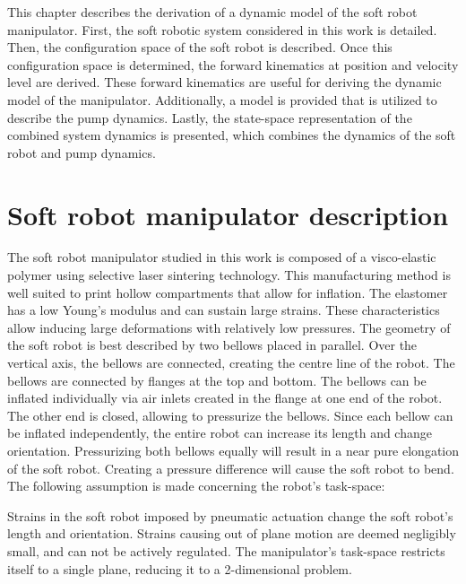 \label{chap2}

This chapter describes the derivation of a dynamic model of the soft robot manipulator. First, the soft robotic system considered in this work is detailed. Then, the configuration space of the soft robot is described. Once this configuration space is determined, the forward kinematics at position and velocity level are derived. These forward kinematics are useful for deriving the dynamic model of the manipulator. Additionally, a model is provided that is utilized to describe the pump dynamics. Lastly, the state-space representation of the combined system dynamics is presented, which combines the dynamics of the soft robot and pump dynamics.



\section{Soft robot manipulator description}

The soft robot manipulator studied in this work is composed of a visco-elastic polymer using selective laser sintering technology. This manufacturing method is well suited to print hollow compartments that allow for inflation. The elastomer has a low Young's modulus and can sustain large strains. These characteristics allow inducing large deformations with relatively low pressures. The geometry of the soft robot is best described by two bellows placed in parallel. Over the vertical axis, the bellows are connected, creating the centre line of the robot. The bellows are connected by flanges at the top and bottom. The bellows can be inflated individually via air inlets created in the flange at one end of the robot. The other end is closed, allowing to pressurize the bellows. Since each bellow can be inflated independently, the entire robot can increase its length and change orientation. Pressurizing both bellows equally will result in a near pure elongation of the soft robot. Creating a pressure difference will cause the soft robot to bend. The following assumption is made concerning the robot's task-space:

\begin{theorem}
Strains in the soft robot imposed by pneumatic actuation change the soft robot's length and orientation. Strains causing out of plane motion are deemed negligibly small, and can not be actively regulated. The manipulator's task-space restricts itself to a single plane, reducing it to a 2-dimensional problem.
\end{theorem}

